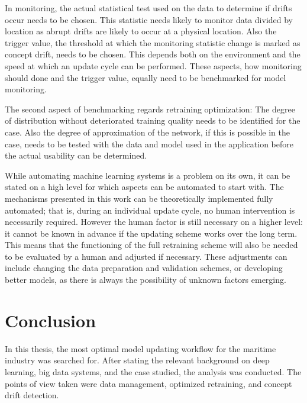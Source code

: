 In monitoring, the actual statistical test used on the data to determine if drifts occur needs to be chosen. This statistic needs likely to monitor data divided by location as abrupt drifts are likely to occur at a physical location. Also the trigger value, the threshold at which the monitoring statistic change is marked as concept drift, needs to be chosen. This depends both on the environment and the speed at which an update cycle can be performed. These aspects, how monitoring should done and the trigger value, equally need to be benchmarked for model monitoring.

The second aspect of benchmarking regards retraining optimization: The degree of distribution without deteriorated training quality needs to be identified for the case. Also the degree of approximation of the network, if this is possible in the case, needs to be tested with the data and model used in the application before the actual usability can be determined.

\enlargethispage{7mm}
While automating machine learning systems is a problem on its own, it can be stated on a high level for which aspects can be automated to start with. The mechanisms presented in this work can be theoretically implemented fully automated; that is, during an individual update cycle, no human intervention is necessarily required. However the human factor is still necessary on a higher level: it cannot be known in advance if the updating scheme works over the long term. This means that the functioning of the full retraining scheme will also be needed to be evaluated by a human and adjusted if necessary. These adjustments can include changing the data preparation and validation schemes, or developing better models, as there is always the possibility of unknown factors emerging.


\chapter{Conclusion}

In this thesis, the most optimal model updating workflow for the maritime industry was searched for. After stating the relevant background on deep learning, big data systems, and the case studied, the analysis was conducted. The points of view taken were data management, optimized retraining, and concept drift detection.

